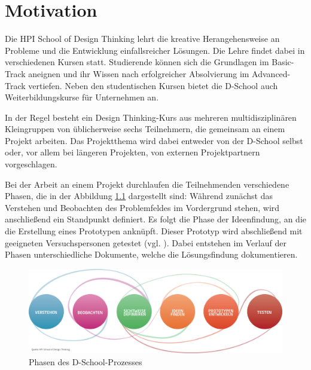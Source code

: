 \chapter{Motivation}
\label{chap:Einleitung}
Die HPI School of Design Thinking lehrt die kreative Herangehensweise an Probleme und die Entwicklung einfallsreicher Lösungen. Die Lehre findet dabei in verschiedenen Kursen statt. Studierende können sich die Grundlagen im Basic-Track aneignen und ihr Wissen nach erfolgreicher Absolvierung im Advanced-Track vertiefen. Neben den studentischen Kursen bietet die D-School auch Weiterbildungskurse für Unternehmen an.

In der Regel besteht ein Design Thinking-Kurs aus mehreren multidisziplinären Kleingruppen von üblicherweise sechs Teilnehmern, die gemeinsam an einem Projekt arbeiten. Das Projektthema wird dabei entweder von der D-School selbst oder, vor allem bei längeren Projekten, von externen Projektpartnern vorgeschlagen. 

Bei der Arbeit an einem Projekt durchlaufen die Teilnehmenden verschiedene Phasen, die in der Abbildung \ref{fig:dschool-prozess} dargestellt sind: Während zunächst das Verstehen und Beobachten des Problemfeldes im Vordergrund stehen, wird anschließend ein Standpunkt definiert. Es folgt die Phase der Ideenfindung, an die die Erstellung eines Prototypen anknüpft. Dieser Prototyp wird abschließend mit geeigneten Versuchspersonen getestet (vgl. \cite{design-thinking}). Dabei entstehen im Verlauf der Phasen unterschiedliche Dokumente, welche die Lösungsfindung dokumentieren.

\begin{figure}[ht]  
  \centering     
  \includegraphics[width=1.0\textwidth]{img/dschool_prozess.jpg}  
   \caption{Phasen des D-School-Prozesses\protect\footnotemark}
  \label{fig:dschool-prozess} 
\end{figure}

